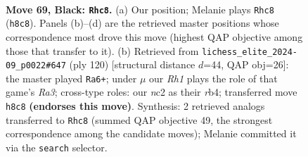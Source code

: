 \documentclass[11pt]{article}
\begin{document}
\clearpage

\begin{figure}[p]\centering
\begin{subfigure}{0.46\textwidth}\centering
\resizebox{\linewidth}{!}{%
\newchessgame
\chessboard[
  setfen={1r5r/pn4k1/1p2p3/4P2p/2P5/K5PR/P1NB1R2/8 b - - 10 69},
  showmover=false,
  pgfstyle=straightmove, color=movearrow, markmove={h8-c8}
]}
\caption{}
\end{subfigure}\hfill
\begin{subfigure}{0.46\textwidth}\centering
\resizebox{\linewidth}{!}{%
\newchessgame
\chessboard[
  setfen={r7/P7/1kp3p1/5bP1/1r5p/R7/5PNK/R7 w - - 0 61},
  showmover=false,
  pgfstyle=straightmove, color=movearrow, markmove={a3-a6}
]}
\caption{}
\end{subfigure}
\\[4pt]

\caption{\textbf{Move 69, Black: \texttt{Rhc8}.} (a) Our position; Melanie plays \texttt{Rhc8} (\texttt{h8c8}). Panels (b)--(d) are the retrieved master positions whose correspondence most drove this move (highest QAP objective among those that transfer to it). (b) Retrieved from \texttt{lichess\_elite\_2024-09\_p0022\#647} (ply 120) [structural distance $d$=44, QAP obj=26]: the master played \texttt{Ra6+}; under $\mu$ our \emph{Rh1} plays the role of that game's \emph{Ra3}; cross-type roles: our \emph{n}c2 as their \emph{r}b4; transferred move \texttt{h8c8} \textbf{(endorses this move)}. Synthesis: 2 retrieved analogs transferred to \texttt{Rhc8} (summed QAP objective 49, the strongest correspondence among the candidate moves); Melanie committed it via the \texttt{search} selector.}
\label{fig:thought-m137}
\end{figure}

\clearpage
\end{document}
